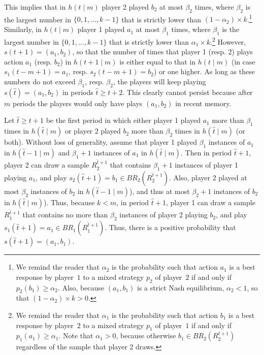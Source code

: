 \documentclass[11.5pt]{article}
\begin{document}
This implies that in $h(t\mid m)$ player 2 played $b_2$ at most $\beta_2$ times, where $\beta_2$ is the largest number in $\{ 0,1,\ldots, k-1\}$ that is strictly lower than $(1-\alpha_2)\times k$.\footnote{We remind the reader that $\alpha_2$ is the probability such that action $a_1$ is a best response by player~$1$ to a mixed strategy $p_2$ of player~$2$ if and only if 
$p_2(b_1) \geq \alpha_2$. Also, because $(a_1,b_1)$ is a strict Nash equilibrium, $\alpha_2 < 1$, so that $(1-\alpha_2)\times k > 0$.}
Similarly, in $h(t\mid m)$ player 1 played $a_1$ at most $\beta_1$ times, where $\beta_1$ is the largest number in $\{ 0, 1,\ldots, k-1\}$ that is strictly lower than $\alpha_1\times k$.\footnote{We remind the reader that $\alpha_1$ is the probability such that action $b_1$ is a best response by player~$2$ to a mixed strategy $p_1$ of player~$1$ if and only if 
$p_1(a_1) \geq \alpha_1$. Note that $\alpha_1 > 0$, because otherwise $b_1\in BR_2(R_2^{t+1})$ regardless of the sample that player 2 draws.} 
However, $s(t+1)=(a_1,b_2)$, so that the number of times that player 1 (resp. 2) plays action $a_1$ (resp. $b_2$) in $h(t+1\mid m)$ is either equal to that in $h(t\mid m)$ (in case $s_1(t-m+1)=a_1$, resp. $s_2(t-m+1)=b_2$) or one higher. 
As long as these numbers do not exceed $\beta_1$, resp. $\beta_2$, the players will keep playing $s(\hat{t})=(a_1,b_2)$ in periods $\hat{t} \geq t+2$. This clearly cannot persist because after $m$ periods the players would only have plays $(a_1,b_2)$ in recent memory. 
%

Let $\hat{t}\geq t+1$ be the first period in which either player 1 played $a_1$ more than $\beta_1$ times in $h(\hat{t}\mid m)$ or player 2 played $b_2$ more than $\beta_2$ times in $h(\hat{t}\mid m)$ (or both). %
Without loss of generality, assume that player 1 played $\beta_1$ instances of $a_1$ in $h(\hat{t}-1\mid m)$ and $\beta_1+1$ instances of $a_1$ in $h(\hat{t}\mid m)$. 
%
Then in period $\hat{t}+1$, player 2 can draw a sample $R_2^{\hat{t}+1}$ that contains $\beta_1+1$ instances of player 1 playing $a_1$, and play $s_2(\hat{t}+1)=b_1\in BR_2(R_2^{\hat{t}+1})$. 
%
Also, player 2 played at most $\beta_2$ instances of $b_2$ in $h(\hat{t}-1\mid m)$), and thus at most $\beta_2+1$ instances of $b_2$ in $h(\hat{t}\mid m)$). Thus, because $k<m$, in period $\hat{t}+1$, player 1 can draw a sample $R_1^{\hat{t}+1}$ that contains no more than $\beta_2$ instances of player 2 playing $b_2$, and play $s_1(\hat{t}+1)=a_1\in BR_1(R_1^{\hat{t}+1})$. 
%
Thus, there is a positive probability that $s(\hat{t}+1)=(a_1,b_1)$. 
\end{document}
